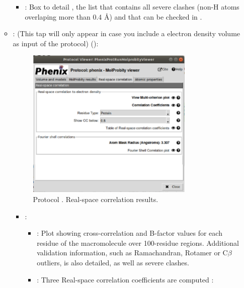 \begin{itemize}
\begin{itemize}
\begin{itemize}
         \item {}: Box to detail , the list that contains all severe clashes (non-H atoms overlaping more than 0.4 \AA) and that can be checked in \coot.
        \end{itemize}
      \item {}: (This tap will only appear in case you include a electron density volume as input of the protocol) ():
       \begin{figure}[H]
         \centering 
         \captionsetup{width=.7\linewidth} 
         \includegraphics[width=0.80\textwidth]{Images_appendix/Fig146.pdf}
         \caption{Protocol . Real-space correlation results.}
         \label{fig:app_protocol_molprobity_4}
        \end{figure}
        \begin{itemize}
         \item {}: 
         \begin{itemize}
          \item {}: Plot showing cross-correlation and B-factor values for each residue of the macromolecule over 100-residue regions. Additional validation information, such as Ramachandran, Rotamer or C{$\beta$} outliers, is also detailed, as well as severe clashes.  
          \item {}: Three Real-space correlation coefficients are computed \citep{afonine2018b}: \setlength{\parindent}{12pt}\\
          

\end{itemize}
\end{itemize}
\end{itemize}
\end{itemize}

